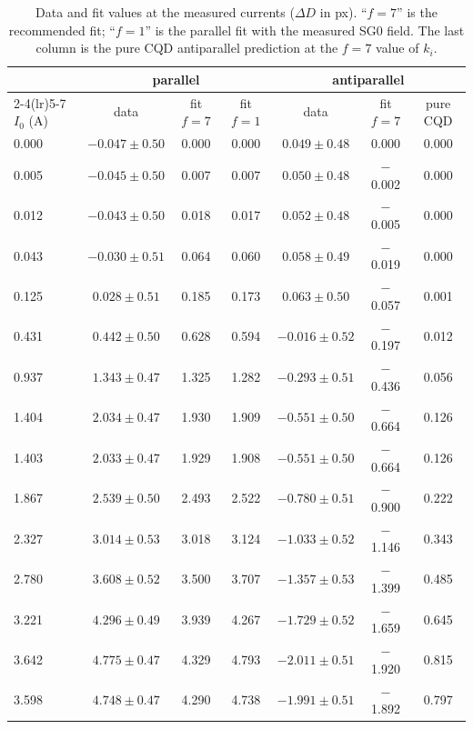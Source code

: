 \documentclass[11pt,a4paper]{article}
\begin{document}
\begin{table}[h]
\centering
\caption{Data and fit values at the measured currents ($\Delta D$ in px). ``$f=7$'' is the recommended
fit; ``$f=1$'' is the parallel fit with the measured SG0 field. The last column is the pure CQD
antiparallel prediction at the $f=7$ value of $k_i$.}
\label{tab:points}
\footnotesize\setlength{\tabcolsep}{5pt}
\begin{tabular}{lcccccc}
\toprule
 & \multicolumn{3}{c}{parallel} & \multicolumn{3}{c}{antiparallel}\\
\cmidrule(lr){2-4}\cmidrule(lr){5-7}
$I_0$ (A) & data & fit $f=7$ & fit $f=1$ & data & fit $f=7$ & pure CQD\\
\midrule
0.000 & $-0.047\pm0.50$ & 0.000 & 0.000 & $0.049\pm0.48$ & 0.000 & 0.000 \\
0.005 & $-0.045\pm0.50$ & 0.007 & 0.007 & $0.050\pm0.48$ & $-$0.002 & 0.000 \\
0.012 & $-0.043\pm0.50$ & 0.018 & 0.017 & $0.052\pm0.48$ & $-$0.005 & 0.000 \\
0.043 & $-0.030\pm0.51$ & 0.064 & 0.060 & $0.058\pm0.49$ & $-$0.019 & 0.000 \\
0.125 & $0.028\pm0.51$ & 0.185 & 0.173 & $0.063\pm0.50$ & $-$0.057 & 0.001 \\
0.431 & $0.442\pm0.50$ & 0.628 & 0.594 & $-0.016\pm0.52$ & $-$0.197 & 0.012 \\
0.937 & $1.343\pm0.47$ & 1.325 & 1.282 & $-0.293\pm0.51$ & $-$0.436 & 0.056 \\
1.404 & $2.034\pm0.47$ & 1.930 & 1.909 & $-0.551\pm0.50$ & $-$0.664 & 0.126 \\
1.403 & $2.033\pm0.47$ & 1.929 & 1.908 & $-0.551\pm0.50$ & $-$0.664 & 0.126 \\
1.867 & $2.539\pm0.50$ & 2.493 & 2.522 & $-0.780\pm0.51$ & $-$0.900 & 0.222 \\
2.327 & $3.014\pm0.53$ & 3.018 & 3.124 & $-1.033\pm0.52$ & $-$1.146 & 0.343 \\
2.780 & $3.608\pm0.52$ & 3.500 & 3.707 & $-1.357\pm0.53$ & $-$1.399 & 0.485 \\
3.221 & $4.296\pm0.49$ & 3.939 & 4.267 & $-1.729\pm0.52$ & $-$1.659 & 0.645 \\
3.642 & $4.775\pm0.47$ & 4.329 & 4.793 & $-2.011\pm0.51$ & $-$1.920 & 0.815 \\
3.598 & $4.748\pm0.47$ & 4.290 & 4.738 & $-1.991\pm0.51$ & $-$1.892 & 0.797 \\
\bottomrule
\end{tabular}
\end{table}
\end{document}
